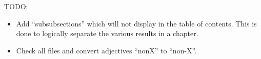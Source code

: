 \documentclass[10pt]{amsbook}
\begin{document}
TODO:
\begin{itemize}
\item Add ``subsubsections'' which will not display in the table of contents. This is done to logically separate the various results in a chapter.
\item Check all files and convert adjectives ``nonX'' to ``non-X''.
\end{itemize}





% 
% 
\end{document}
